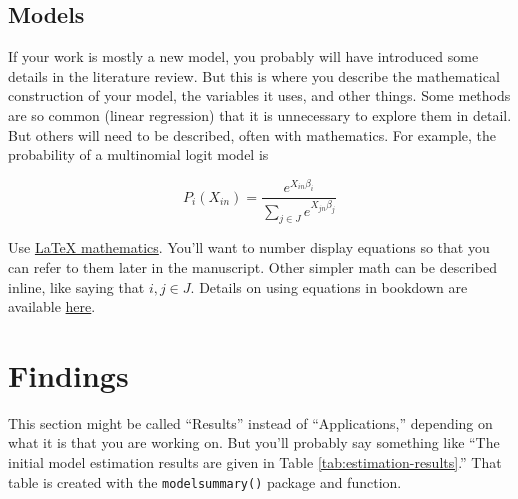 \documentclass[3p, authoryear]{elsarticle} %
\begin{document}
\hypertarget{models}{%
\subsection{Models}\label{models}}

If your work is mostly a new model, you probably will have introduced some
details in the literature review. But this is where you describe the
mathematical construction of your model, the variables it uses, and other
things. Some methods are so common (linear regression) that it is unnecessary to
explore them in detail. But others will need to be described, often with
mathematics. For example, the probability of a multinomial logit model is

\begin{equation}
  P_i(X_{in}) = \frac{e^{X_{in}\beta_i}}{\sum_{j \in J}e^{X_{jn}\beta_j}}
  \label{eq:mnl}
\end{equation}

Use \href{https://www.overleaf.com/learn/latex/mathematical_expressions}{LaTeX mathematics}.
You'll want to number display equations so that you can
refer to them later in the manuscript. Other simpler math can be described inline,
like saying that \(i, j \in J\). Details on using equations in bookdown are available
\href{https://bookdown.org/yihui/bookdown/markdown-extensions-by-bookdown.html}{here}.

\hypertarget{findings}{%
\section{Findings}\label{findings}}

This section might be called ``Results'' instead of ``Applications,'' depending
on what it is that you are working on. But you'll probably say something like
``The initial model estimation results are given in Table \ref{tab:estimation-results}.''
That table is created with the \texttt{modelsummary()} package and function.
\end{document}
